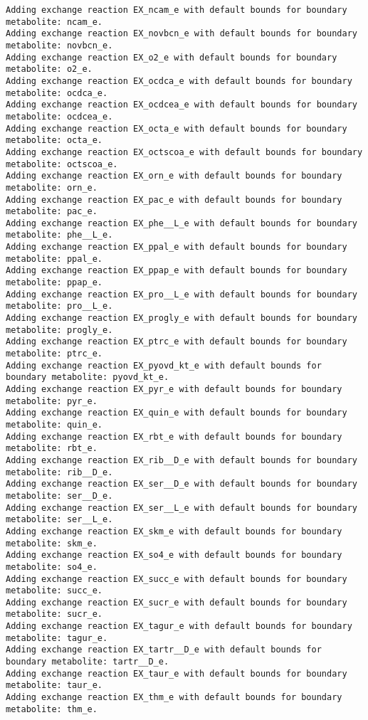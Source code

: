 \documentclass[
  letterpaper,
  DIV=11,
  numbers=noendperiod]{scrartcl}
\begin{document}
\begin{verbatim}
Adding exchange reaction EX_ncam_e with default bounds for boundary metabolite: ncam_e.
Adding exchange reaction EX_novbcn_e with default bounds for boundary metabolite: novbcn_e.
Adding exchange reaction EX_o2_e with default bounds for boundary metabolite: o2_e.
Adding exchange reaction EX_ocdca_e with default bounds for boundary metabolite: ocdca_e.
Adding exchange reaction EX_ocdcea_e with default bounds for boundary metabolite: ocdcea_e.
Adding exchange reaction EX_octa_e with default bounds for boundary metabolite: octa_e.
Adding exchange reaction EX_octscoa_e with default bounds for boundary metabolite: octscoa_e.
Adding exchange reaction EX_orn_e with default bounds for boundary metabolite: orn_e.
Adding exchange reaction EX_pac_e with default bounds for boundary metabolite: pac_e.
Adding exchange reaction EX_phe__L_e with default bounds for boundary metabolite: phe__L_e.
Adding exchange reaction EX_ppal_e with default bounds for boundary metabolite: ppal_e.
Adding exchange reaction EX_ppap_e with default bounds for boundary metabolite: ppap_e.
Adding exchange reaction EX_pro__L_e with default bounds for boundary metabolite: pro__L_e.
Adding exchange reaction EX_progly_e with default bounds for boundary metabolite: progly_e.
Adding exchange reaction EX_ptrc_e with default bounds for boundary metabolite: ptrc_e.
Adding exchange reaction EX_pyovd_kt_e with default bounds for boundary metabolite: pyovd_kt_e.
Adding exchange reaction EX_pyr_e with default bounds for boundary metabolite: pyr_e.
Adding exchange reaction EX_quin_e with default bounds for boundary metabolite: quin_e.
Adding exchange reaction EX_rbt_e with default bounds for boundary metabolite: rbt_e.
Adding exchange reaction EX_rib__D_e with default bounds for boundary metabolite: rib__D_e.
Adding exchange reaction EX_ser__D_e with default bounds for boundary metabolite: ser__D_e.
Adding exchange reaction EX_ser__L_e with default bounds for boundary metabolite: ser__L_e.
Adding exchange reaction EX_skm_e with default bounds for boundary metabolite: skm_e.
Adding exchange reaction EX_so4_e with default bounds for boundary metabolite: so4_e.
Adding exchange reaction EX_succ_e with default bounds for boundary metabolite: succ_e.
Adding exchange reaction EX_sucr_e with default bounds for boundary metabolite: sucr_e.
Adding exchange reaction EX_tagur_e with default bounds for boundary metabolite: tagur_e.
Adding exchange reaction EX_tartr__D_e with default bounds for boundary metabolite: tartr__D_e.
Adding exchange reaction EX_taur_e with default bounds for boundary metabolite: taur_e.
Adding exchange reaction EX_thm_e with default bounds for boundary metabolite: thm_e.

\end{verbatim}
\end{document}

